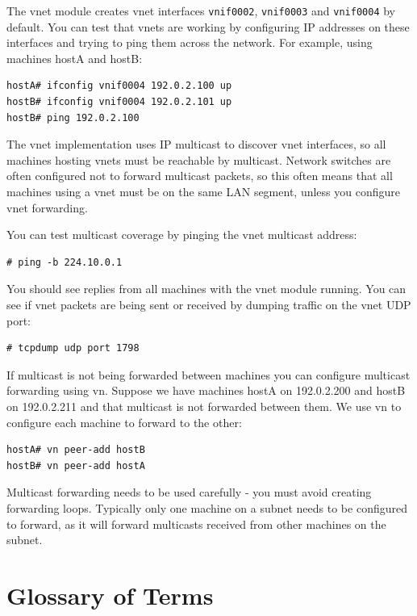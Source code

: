 \documentclass[11pt,twoside,final,openright]{report}
\begin{document}
The vnet module creates vnet interfaces \texttt{vnif0002},
\texttt{vnif0003} and \texttt{vnif0004} by default. You can test that
vnets are working by configuring IP addresses on these interfaces
and trying to ping them across the network. For example, using machines
hostA and hostB:
\begin{verbatim}
hostA# ifconfig vnif0004 192.0.2.100 up
hostB# ifconfig vnif0004 192.0.2.101 up
hostB# ping 192.0.2.100
\end{verbatim}

The vnet implementation uses IP multicast to discover vnet interfaces, so
all machines hosting vnets must be reachable by multicast. Network switches
are often configured not to forward multicast packets, so this often
means that all machines using a vnet must be on the same LAN segment,
unless you configure vnet forwarding.

You can test multicast coverage by pinging the vnet multicast address:
\begin{verbatim}
# ping -b 224.10.0.1
\end{verbatim}
You should see replies from all machines with the vnet module running.
You can see if vnet packets are being sent or received by dumping traffic
on the vnet UDP port:
\begin{verbatim}
# tcpdump udp port 1798
\end{verbatim}

If multicast is not being forwarded between machines you can configure
multicast forwarding using vn. Suppose we have machines hostA on 192.0.2.200
and hostB on 192.0.2.211 and that multicast is not forwarded between them.
We use vn to configure each machine to forward to the other:
\begin{verbatim}
hostA# vn peer-add hostB
hostB# vn peer-add hostA
\end{verbatim}
Multicast forwarding needs to be used carefully - you must avoid creating forwarding
loops. Typically only one machine on a subnet needs to be configured to forward,
as it will forward multicasts received from other machines on the subnet.

\chapter{Glossary of Terms}
\end{document}
